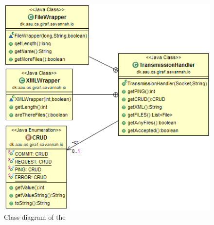 \begin{figure}[H]
	\centering
		\includegraphics[scale=0.70]{images/TransmissionHandler.PNG}
	\caption{Class-diagram of the }
	\label{fig:app:TransmissionHandler}
\end{figure}